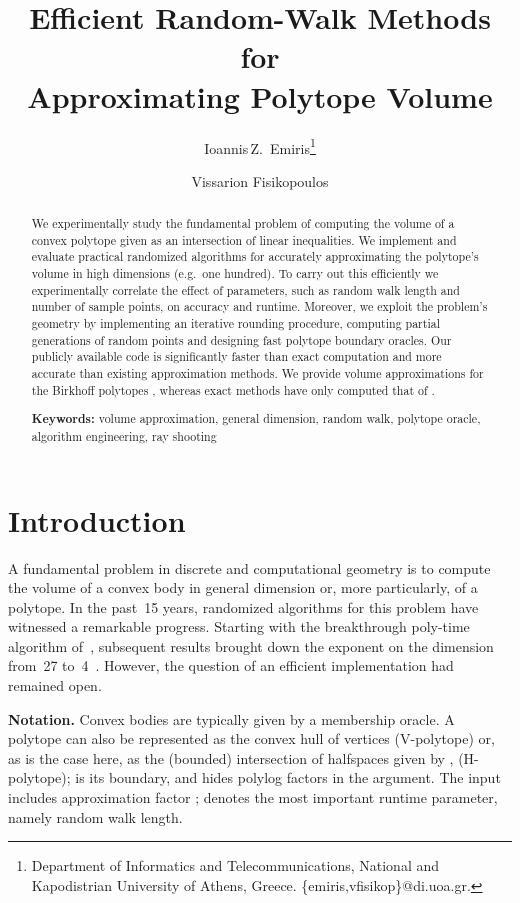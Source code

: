 \documentclass[11pt,a4paper]{article}
\title{Efficient Random-Walk Methods for \\ Approximating Polytope Volume}
\author{Ioannis\,Z.~Emiris\thanks{
Department of Informatics and Telecommunications,
National and Kapodistrian University of Athens, Greece. 
\{emiris,vfisikop\}@di.uoa.gr.}
\and Vissarion Fisikopoulos\footnotemark[1]}
\date{}
\begin{document}
\maketitle
\thispagestyle{empty}

\begin{abstract} 
We experimentally study the fundamental problem of computing the volume of a convex polytope given as an intersection of linear inequalities. 
We implement and evaluate practical randomized algorithms for accurately
approximating the polytope's volume in high dimensions (e.g.\ one hundred).  
To carry out this efficiently we experimentally correlate the effect
of parameters, such as random walk length and number of sample points, on accuracy and runtime.
Moreover, we exploit the problem's geometry by implementing an iterative rounding procedure, computing partial generations of random points and designing fast polytope boundary oracles. 
Our publicly available code is significantly faster than exact computation and more accurate
than existing approximation methods. We provide volume approximations for the Birkhoff polytopes , whereas exact methods have only computed that of . 

\medskip

{\bf Keywords:} volume approximation, general dimension, random walk,
polytope oracle, algorithm engineering, ray shooting 
\end{abstract}

\newpage
\setcounter{page}{1}
\section{Introduction}\label{sec:intro}

A fundamental problem in discrete and computational geometry is
to compute the volume of a convex body in general dimension or,
more particularly, of a polytope.
In the past~15 years, randomized algorithms for this problem have
witnessed a remarkable progress.
Starting with the breakthrough poly-time algorithm
of~\cite{DyerFrKa91}, subsequent results brought down
the exponent on the dimension from~27 to~4~\cite{LovaszVemp06vol}.
However, the question of an efficient implementation had remained open.  

\textbf{Notation.}
Convex bodies are typically given by a membership oracle.
A polytope  can also be represented as the convex hull
of vertices (V-polytope) or, as is the case here, as the (bounded) intersection
 of  halfspaces given by
,  (H-polytope);
 is its boundary, and
 hides polylog factors in the argument.
The input includes approximation factor ;
 denotes the most important runtime parameter, namely random walk length.
\end{document}
